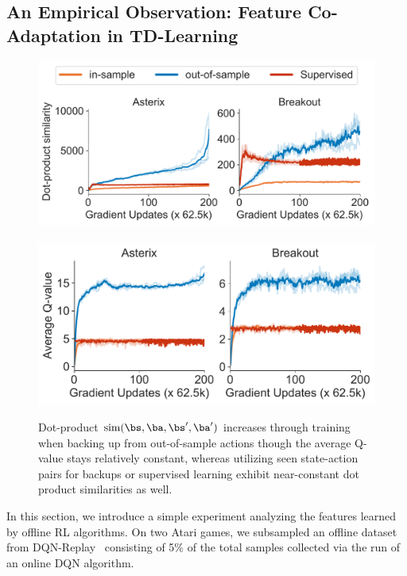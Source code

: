 \subsection{An Empirical Observation: Feature Co-Adaptation in TD-Learning}
\label{sec:analysis}
\begin{figure}
    \centering
    \vspace{-15pt}
    \includegraphics[width=0.97\linewidth]{figures/figure1_dotproduct_dot_products_final.pdf}\\
    ~~~\includegraphics[width=0.94\linewidth]{section3_figs/figure1_dotproduct_q_values (1).pdf}
    \vspace{-0.24cm}
    \caption{\small{Dot-product $\text{sim}(\bs, \ba, \bs', \ba')$ increases through training when backing up from out-of-sample actions though the average Q-value stays relatively constant, whereas utilizing seen state-action pairs for backups or supervised learning exhibit near-constant dot product similarities as well.}}  
    \label{fig:dot_products}
    \vspace{-0.4cm}
\end{figure}
In this section, we introduce a simple experiment analyzing the features learned by offline RL algorithms. On two Atari games, we subsampled an offline dataset from DQN-Replay~\citep{agarwal2019optimistic} consisting of 5\% of the total samples collected via the run of an online DQN algorithm.
